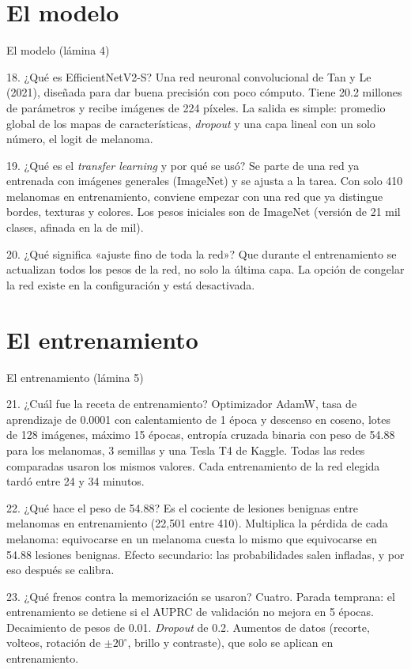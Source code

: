 \documentclass[aspectratio=169,10pt]{beamer}
\newcommand{\qa}[2]{\begin{block}{#1}\footnotesize #2\end{block}}
\begin{document}
\section{El modelo}
\begin{frame}{El modelo (lámina 4)}
  \qa{18. ¿Qué es EfficientNetV2-S?}{
    Una red neuronal convolucional de Tan y Le (2021), diseñada para dar buena precisión con poco cómputo. Tiene 20.2 millones de parámetros y recibe imágenes de 224 píxeles. La salida es simple: promedio global de los mapas de características, \textit{dropout} y una capa lineal con un solo número, el logit de melanoma.}
  \qa{19. ¿Qué es el \textit{transfer learning} y por qué se usó?}{
    Se parte de una red ya entrenada con imágenes generales (ImageNet) y se ajusta a la tarea. Con solo 410 melanomas en entrenamiento, conviene empezar con una red que ya distingue bordes, texturas y colores. Los pesos iniciales son de ImageNet (versión de 21 mil clases, afinada en la de mil).}
  \qa{20. ¿Qué significa «ajuste fino de toda la red»?}{
    Que durante el entrenamiento se actualizan todos los pesos de la red, no solo la última capa. La opción de congelar la red existe en la configuración y está desactivada.}
\end{frame}

\section{El entrenamiento}
\begin{frame}{El entrenamiento (lámina 5)}
  \qa{21. ¿Cuál fue la receta de entrenamiento?}{
    Optimizador AdamW, tasa de aprendizaje de 0.0001 con calentamiento de 1 época y descenso en coseno, lotes de 128 imágenes, máximo 15 épocas, entropía cruzada binaria con peso de 54.88 para los melanomas, 3 semillas y una Tesla T4 de Kaggle. Todas las redes comparadas usaron los mismos valores. Cada entrenamiento de la red elegida tardó entre 24 y 34 minutos.}
  \qa{22. ¿Qué hace el peso de 54.88?}{
    Es el cociente de lesiones benignas entre melanomas en entrenamiento (22,501 entre 410). Multiplica la pérdida de cada melanoma: equivocarse en un melanoma cuesta lo mismo que equivocarse en 54.88 lesiones benignas. Efecto secundario: las probabilidades salen infladas, y por eso después se calibra.}
  \qa{23. ¿Qué frenos contra la memorización se usaron?}{
    Cuatro. Parada temprana: el entrenamiento se detiene si el AUPRC de validación no mejora en 5 épocas. Decaimiento de pesos de 0.01. \textit{Dropout} de 0.2. Aumentos de datos (recorte, volteos, rotación de $\pm 20^{\circ}$, brillo y contraste), que solo se aplican en entrenamiento.}
\end{frame}
\end{document}
